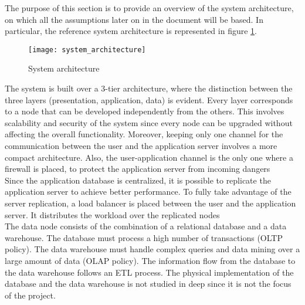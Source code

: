 \documentclass[./main.tex]{subfiles}
\begin{document}
The purpose of this section is to provide an overview of the system architecture, on which all the assumptions later on in the document will be based. In particular, the reference system architecture is represented in figure \ref{fig:system_architecture}.

\begin{figure}[H]
\centering
\texttt{[image: system\_architecture]}
\caption{System architecture}
\label{fig:system_architecture}
\end{figure}

The system is built over a 3-tier architecture, where the distinction between the
three layers (presentation, application, data) is evident. Every layer
corresponds to a node that can be developed independently from the others. This
involves scalability and security of the system since every node can be upgraded
without affecting the overall functionality. Moreover, keeping only one channel
for the communication between the user and the application server involves a more
compact architecture. Also, the user-application channel is the only one where a
firewall is placed, to protect the application server from incoming dangers
\medskip\\
Since the application database is centralized, it is possible to replicate the
application server to achieve better performance. To fully take advantage of the
server replication, a load balancer is placed between the user and the
application server. It distributes the workload over the replicated nodes
\medskip\\
The data node consists of the combination of a relational database and a data
warehouse. The database must process a high number of transactions (OLTP policy).
The data warehouse must handle complex queries and data mining over a large
amount of data (OLAP policy). The information flow from the database to the data
warehouse follows an ETL process. The physical implementation of the database and
the data warehouse is not studied in deep since it is not the focus of the
project.
\end{document}
